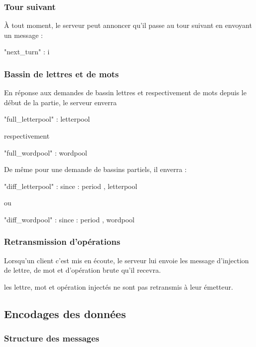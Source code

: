 \documentclass{article}
\begin{document}
\subsubsection{Tour suivant}
\label{sec:tour-suivant}
À tout moment, le serveur peut annoncer qu'il passe au tour suivant en
envoyant un message :
\begin{jsonMessage}
  { "next_turn" : i }
\end{jsonMessage}

\subsubsection{Bassin de lettres et de mots}
\label{sec:bassin-de-lettres}
En réponse aux demandes de bassin lettres et respectivement de mots
depuis le début de la partie, le serveur enverra
\begin{jsonMessage}
  { "full_letterpool" : letterpool }
\end{jsonMessage}
respectivement
\begin{jsonMessage}
  { "full_wordpool" : wordpool }
\end{jsonMessage}
De même pour une demande de bassins partiels, il enverra :

 \begin{jsonMessage}
   { "diff_letterpool" : {since : period , letterpool } }
 \end{jsonMessage}
 ou
 \begin{jsonMessage}
   { "diff_wordpool" : {since : period , wordpool } }
 \end{jsonMessage}

 \subsubsection{Retransmission d'opérations}
 \label{sec:forward}
 Lorsqu'un client c'est mis en écoute, le serveur lui envoie les
 message d'injection de lettre, de mot et d'opération brute qu'il
 recevra.

 les lettre, mot et opération injectés ne sont pas retransmis à leur
 émetteur.

 \subsection{Encodages des données}
 \label{sec:encodages}

 \subsubsection{Structure des messages}
 \label{sec:struct-des-mess}
\end{document}
